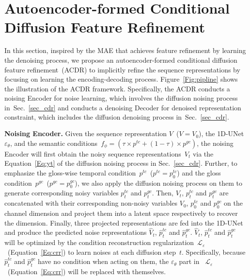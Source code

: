 \documentclass[sigconf]{acmart}
\begin{document}
\section{Autoencoder-formed Conditional Diffusion Feature Refinement}
\label{sec_ACDR}
In this section, inspired by the MAE that achieves feature refinement by learning the denoising process, we propose an autoencoder-formed conditional diffusion feature refinement~(ACDR) to
implicitly refine the sequence representations by 
focusing on learning the encoding-decoding process.
Figure~\ref{Fig:pipline} shows the illustration of the ACDR framework.
Specifically, the ACDR conducts a noising Encoder for noise learning, which involves the diffusion noising process in~Sec.~\ref{sec_cdr} and conducts a denoising Decoder for denoised representation constraint, which includes the diffusion denoising process in~Sec.~\ref{sec_cdr}.
  


\noindent \textbf{Noising Encoder.}
Given the sequence representation $V$~($V=V_0$), the 1D-UNet~$\varepsilon_\theta$, and the semantic conditions~$f_\phi= (\tau  \times p^{tc}+(1-\tau) \times p^{gc})$, the noising Encoder will first obtain the noisy sequence representations~$V_t$ via the Equation~\ref{Eq:yt} of the diffusion noising process in Sec.~\ref{sec_cdr}.
Further, to emphasize the gloss-wise temporal condition~$p^{tc}$~($p^{tc}=p^{tc}_0$) and the gloss condition~$p^{gc}$~($p^{gc}=p^{gc}_0$), we also apply the diffusion noising process on them to generate corresponding noisy variables $p^{tc}_t$ and $p^{gc}_t$.
Then, $V_t$, $p^{tc}_t$ and $p^{gc}_t$ are concatenated with their corresponding non-noisy variables $V_0$, $p^{tc}_0$ and $p^{gc}_0$ on the channel dimension and project them into a latent space respectively to recover the dimension.
Finally, three projected representations are fed into the 1D-UNet and produce the predicted noise representations $\widehat V_t$, $\widehat p^{tc}_t$ and $\widehat p^{gc}_t$. 
$\widehat V_t$, $\widehat p^{tc}_t$ and $\widehat p^{gc}_t$ will be optimized by the condition reconstruction regularization~$\mathcal{L}_{\varepsilon}$~(Equation~\ref{Eq:crr}) to learn noises at each diffusion step~$t$.
Specifically, because $\widehat p^{tc}_t$ and $\widehat p^{gc}_t$ have no condition when acting on them, the $\varepsilon_\theta$ part in ~$\mathcal{L}_{\varepsilon}$~(Equation~\ref{Eq:crr}) will be replaced with themselves.
\end{document}
